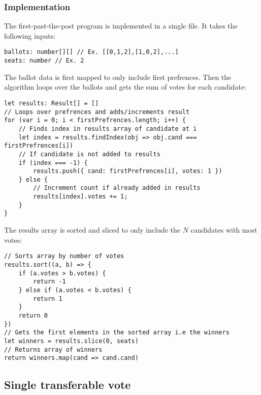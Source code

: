 \subsubsection{Implementation}
The first-past-the-post program is implemented in a single file. It takes the following inputs:
\begin{lstlisting}
ballots: number[][] // Ex. [[0,1,2],[1,0,2],...]
seats: number // Ex. 2
\end{lstlisting}
The ballot data is first mapped to only include first prefrences. Then the algorithm loops over the ballots and gets the sum of votes for each candidate:
\begin{lstlisting}
let results: Result[] = []
// Loops over prefrences and adds/increments result
for (var i = 0; i < firstPrefrences.length; i++) {
    // Finds index in results array of candidate at i
    let index = results.findIndex(obj => obj.cand === firstPrefrences[i])
    // If candidate is not added to results
    if (index === -1) {
        results.push({ cand: firstPrefrences[i], votes: 1 })
    } else {
        // Increment count if already added in results
        results[index].votes += 1;
    }
}
\end{lstlisting}
The results array is sorted and sliced to only include the $N$ candidates with most votes:
\begin{lstlisting}
// Sorts array by number of votes
results.sort((a, b) => {
    if (a.votes > b.votes) {
        return -1
    } else if (a.votes < b.votes) {
        return 1
    }
    return 0
})
// Gets the first elements in the sorted array i.e the winners
let winners = results.slice(0, seats)
// Returns array of winners
return winners.map(cand => cand.cand)
\end{lstlisting}
\subsection{Single transferable vote}
